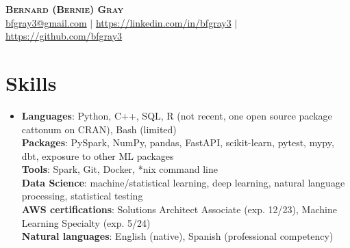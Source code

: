 \documentclass[letterpaper,11pt]{article}
\begin{document}
\begin{center}
    \textbf{\Huge \scshape Bernard (Bernie) Gray} \\ \vspace{1pt}
    \href{mailto:bfgray3@gmail.com}{bfgray3@gmail.com} $|$
    \url{https://linkedin.com/in/bfgray3} $|$
    \url{https://github.com/bfgray3}
\end{center}

\section{Skills}
 \begin{itemize}[leftmargin=0.15in, label={}]
    \item{
     \textbf{Languages}{: Python, C++, SQL, R (not recent, one open source package cattonum on CRAN), Bash (limited)} \\
     \textbf{Packages}{: PySpark, NumPy, pandas, FastAPI, scikit-learn, pytest, mypy, dbt, exposure to other ML packages} \\
     \textbf{Tools}{: Spark, Git, Docker, *nix command line} \\
     \textbf{Data Science}{: machine/statistical learning, deep learning, natural language processing, statistical testing} \\
     \textbf{AWS certifications}{: Solutions Architect Associate (exp. 12/23), Machine Learning Specialty (exp. 5/24)} \\
     \textbf{Natural languages}{: English (native), Spanish (professional competency)}
}
 \end{itemize}
\end{document}

